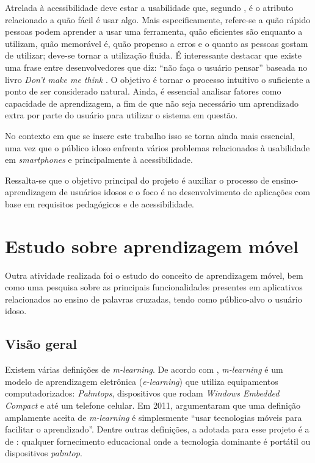 Atrelada à acessibilidade deve estar a usabilidade que, segundo \cite{nielsenPrioritizingWebUsability},
é o atributo relacionado a quão fácil é usar algo. Mais especificamente, refere-se a quão rápido pessoas podem aprender a usar uma ferramenta, quão eficientes são enquanto a utilizam, quão memorável é, quão propenso a erros e o quanto as pessoas gostam de utilizar; deve-se tornar a utilização fluida. É interessante destacar que existe uma frase entre desenvolvedores que diz: ``não faça o usuário pensar'' baseada no livro \textit{Don't make me think} \citep{steveDont2005}. O objetivo é tornar o processo intuitivo o suficiente a ponto de ser considerado natural.
Ainda, é essencial analisar fatores como capacidade de aprendizagem, a fim de que não seja necessário um aprendizado extra por parte do usuário para utilizar o sistema em questão.

No contexto em que se insere este trabalho isso se torna ainda mais essencial, uma vez que o público idoso enfrenta vários problemas relacionados à usabilidade em \textit{smartphones} \citep{dificuldadesIdosos} e principalmente à acessibilidade. %


Ressalta-se que o objetivo principal do projeto é auxiliar o processo de ensino-aprendizagem de usuários idosos e o foco é no desenvolvimento de aplicações com base em requisitos pedagógicos e de acessibilidade.

\section{Estudo sobre aprendizagem móvel}\label{sec:estudos_ap_movel} 
Outra atividade realizada foi o estudo do conceito de aprendizagem móvel, bem como uma pesquisa sobre as principais funcionalidades presentes em aplicativos relacionados ao ensino de palavras cruzadas, tendo como público-alvo o usuário idoso.

\subsection{Visão geral}
Existem várias definições de \textit{m-learning}. %
De acordo com \cite{Quinn2000}, \textit{m-learning} é um modelo de aprendizagem eletrônica (\textit{e-learning}) que utiliza equipamentos computadorizados: \textit{Palmtops}, dispositivos que rodam \textit{Windows Embedded Compact} e até um telefone celular.
Em 2011, \cite{hwang2011research} argumentaram que uma definição amplamente aceita de \textit{m-learning} é simplesmente ``usar tecnologias móveis para facilitar o aprendizado''. Dentre outras definições, a adotada para esse projeto é a de \cite{traxler2005defining}: qualquer fornecimento educacional onde a tecnologia dominante é portátil ou dispositivos \textit{palmtop}.


